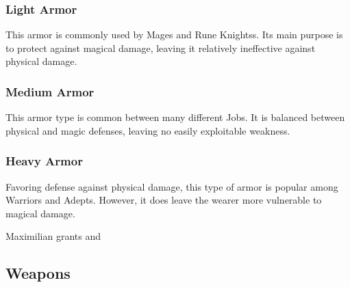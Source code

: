 \begin{center}
\end{center}
\clearpage

\subsubsection{Light Armor}

This armor is commonly used by Mages and Rune Knightss. Its main purpose is to protect against magical damage, leaving it relatively ineffective against physical damage.

\begin{tabarm}[label=inv-larm]
    
\end{tabarm}

\clearpage
\subsubsection{Medium Armor}

This armor type is common between many different Jobs.  It is balanced between physical and magic defenses, leaving no easily exploitable weakness.

\begin{tabarm}[label=inv-marm]
    
\end{tabarm}

\clearpage
\subsubsection{Heavy Armor}

Favoring defense against physical damage, this type of armor is popular among Warriors and Adepts.  However, it does leave the wearer more vulnerable to magical damage.

\begin{tabarm}[label=inv-harm]
    
\end{tabarm}
{\footnotesize Maximilian grants  and }
\clearpage

\subsection{Weapons}\label{subsec:inv-weapons}

